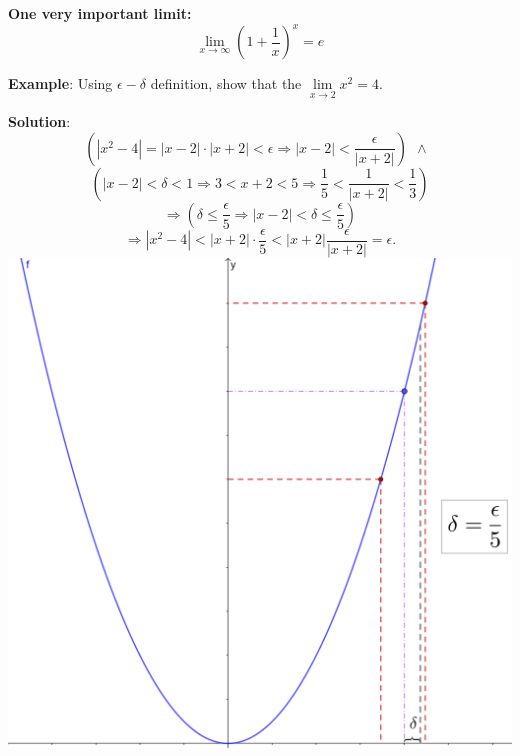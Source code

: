 \documentclass[12pt]{article}
\begin{document}
\newpage
\textbf{One very important limit:} $$\lim \limits_{x \to \infty} \left(1+\frac{1}{x}\right)^x= e$$

\textbf{Example}: Using $\epsilon -\delta$ definition, show that the $\lim \limits_{x \to 2} x^2=4$.

\textbf{Solution}: $$\left(|x^2-4|= |x-2|\cdot |x+2|<\epsilon \Rightarrow |x-2|<\dfrac{\epsilon}{|x+2|}\right) \ \ \wedge \ \ $$$$\left(|x-2|<\delta<1 \Rightarrow 3<x+2<5 \Rightarrow \frac{1}{5}<\frac{1}{|x+2|}<\frac{1}{3}\right)$$$$\Rightarrow \left(\delta \leq \frac{\epsilon}{5} \Rightarrow |x-2|<\delta\leq \frac{\epsilon}{5}\right)$$$$\Rightarrow |x^2-4|<|x+2|\cdot \frac{\epsilon}{5}<|x+2| \frac{\epsilon}{|x+2|} = \epsilon.$$
\includegraphics[scale=0.28]{epsilondelta.png}
\newpage
\end{document}
